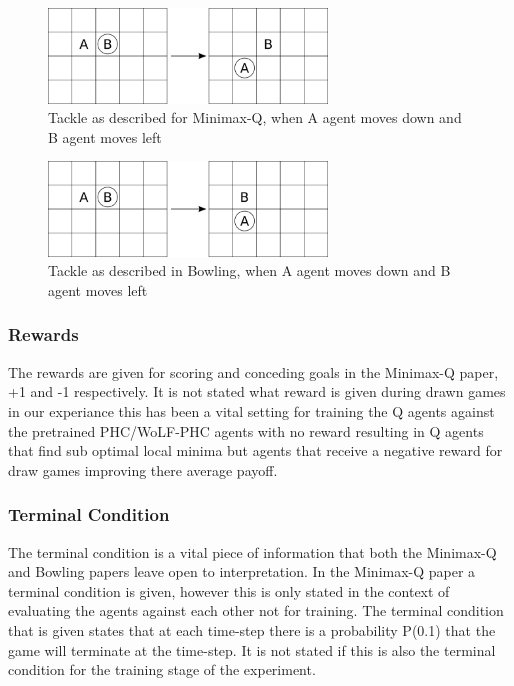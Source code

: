\documentclass{article}
\begin{document}
\begin{figure}
    \centering
    \includegraphics[width=20em]{Figures/minimax-tackle}
    \caption{Tackle as described for Minimax-Q, when A agent moves down and B agent moves left}
    \label{fig:minimax-tackle}
\end{figure}

\begin{figure}
    \centering
    \includegraphics[width=20em]{Figures/bowling-tackle}
    \caption{Tackle as described in Bowling, when A agent moves down and B agent moves left}
    \label{fig:bowling-tackle}
\end{figure}

\subsubsection*{Rewards}

The rewards are given for scoring and conceding goals in the Minimax-Q paper, +1 and -1 respectively. It is not stated what reward is given during drawn games in our experiance this has been a vital setting for training the Q agents against the pretrained PHC/WoLF-PHC agents with no reward resulting in Q agents that find sub optimal local minima but agents that receive a negative reward for draw games improving there average payoff.

\subsubsection*{Terminal Condition}
The terminal condition is a vital piece of information that both the Minimax-Q and Bowling papers leave open to interpretation. In the Minimax-Q paper a terminal condition is given, however this is only stated in the context of evaluating the agents against each other not for training. The terminal condition that is given states that at each time-step there is a probability P(0.1) that the game will terminate at the time-step. It is not stated if this is also the terminal condition for the training stage of the experiment.
\end{document}

